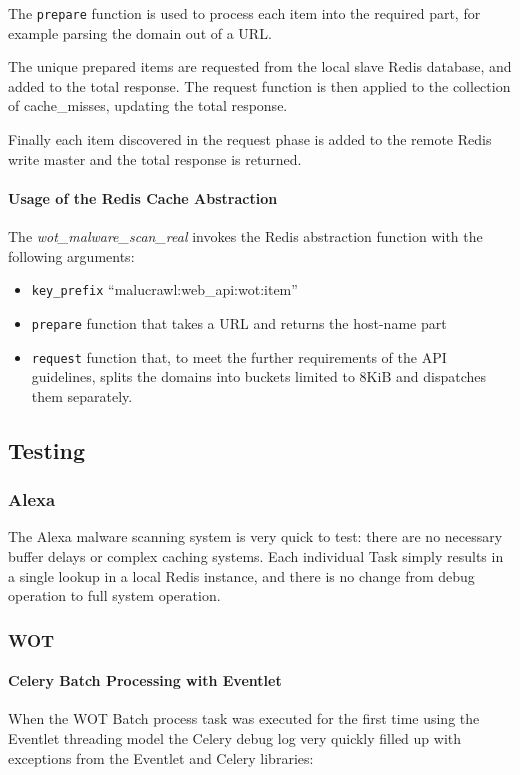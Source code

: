 The \verb`prepare` function is used to process each item into the required part, for example parsing the domain out of a URL.

The unique prepared items are requested from the local slave Redis database, and added to the total response. The request function is then applied to the collection of cache\_misses, updating the total response.

Finally each item discovered in the request phase is added to the remote Redis write master and the total response is returned.

\paragraph{Usage of the Redis Cache Abstraction}
The \emph{wot\_malware\_scan\_real} invokes the Redis abstraction function with the following arguments:
\begin{itemize}
    \item \verb`key_prefix` ``malucrawl:web\_api:wot:{item}''
    \item \verb`prepare` function that takes a URL and returns the host-name part
    \item \verb`request` function that, to meet the further requirements of the API guidelines, splits the domains into buckets limited to 8KiB and dispatches them separately.
\end{itemize}

\subsection{Testing}
\subsubsection{Alexa}
The Alexa malware scanning system is very quick to test: there are no necessary buffer delays or complex caching systems. Each individual Task simply results in a single lookup in a local Redis instance, and there is no change from debug operation to full system operation.

\subsubsection{WOT}
\paragraph{Celery Batch Processing with Eventlet}
When the WOT Batch process task was executed for the first time using the Eventlet threading model the Celery debug log very quickly filled up with exceptions from the Eventlet and Celery libraries:

